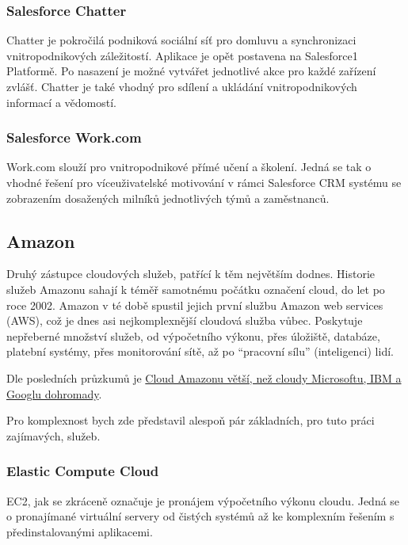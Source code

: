 \subsubsection{Salesforce Chatter}
Chatter je pokročilá podniková sociální síť pro domluvu a synchronizaci vnitropodnikových záležitostí. Aplikace je opět postavena na Salesforce1 Platformě. Po nasazení je možné vytvářet jednotlivé akce pro každé zařízení zvlášť. Chatter je také vhodný pro sdílení a ukládání vnitropodnikových informací a vědomostí.\cite{salesforce:chatter}

\subsubsection{Salesforce Work.com}
Work.com slouží pro vnitropodnikové přímé učení a školení. Jedná se tak o vhodné řešení pro víceuživatelské motivování v rámci Salesforce CRM systému se zobrazením dosažených milníků jednotlivých týmů a zaměstnanců.\cite{salesforce:work}

\subsection{Amazon}
Druhý zástupce cloudových služeb, patřící k těm největším dodnes. Historie služeb Amazonu sahají k téměř samotnému počátku označení cloud, do let po roce 2002. Amazon v té době spustil jejich první službu Amazon web services (AWS), což je dnes asi nejkomplexnější cloudová služba vůbec. Poskytuje nepřeberné množství služeb, od výpočetního výkonu, přes úložiště, databáze, platební systémy, přes monitorování sítě, až po "`pracovní sílu"' (inteligenci) lidí.

Dle posledních průzkumů je \href{http://connect.zive.cz/bleskovky/cloud-amazonu-je-vetsi-nez-cloudy-microsoftu-ibm-a-googlu-dohromady/sc-321-a-171477/default.aspx}{Cloud Amazonu větší, než cloudy Microsoftu, IBM a Googlu dohromady\cite{zive:amazonCloud}}.

Pro komplexnost bych zde představil alespoň pár základních, pro tuto práci zajímavých, služeb.

\subsubsection{Elastic Compute Cloud}
\label{sec:AmazonElasticCC}
EC2, jak se zkráceně označuje je pronájem výpočetního výkonu cloudu. Jedná se o pronajímané virtuální servery od čistých systémů až ke komplexním řešením s předinstalovanými aplikacemi.

